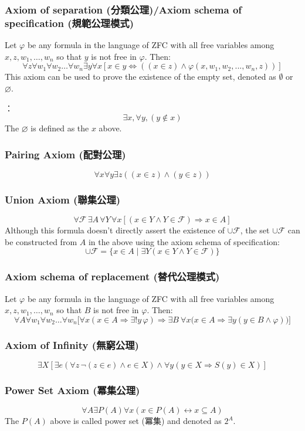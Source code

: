 \documentclass[a4paper,12pt]{article}
\begin{document}
\subsubsection{Axiom of separation (分類公理)/Axiom schema of specification (規範公理模式)}
Let $\varphi$ be any formula in the language of ZFC with all free variables among $x,z,w_{1},\ldots ,w_{n}$ so that $y$ is not free in 
$\varphi$. Then:
\[\forall z\forall w_{1}\forall w_{2}\ldots \forall w_{n}\exists y\forall x[x\in y\Leftrightarrow ((x\in z)\land \varphi (x,w_{1},w_{2},...,w_{n},z))]\]
This axiom can be used to prove the existence of the empty set, denoted as $\emptyset$ or $\varnothing$.

：
\[\exists x , \forall y , (y \notin x) \]
The $\varnothing$ is defined as the $x$ above.
\subsubsection{Pairing Axiom (配對公理)}
\[ \forall x\forall y\exists z((x\in z)\land (y\in z))\]
\subsubsection{Union Axiom (聯集公理)}
\[ \forall {\mathcal {F}}\,\exists A\,\forall Y\,\forall x[(x\in Y\land Y\in {\mathcal {F}})\Rightarrow x\in A]\]
Although this formula doesn't directly assert the existence of $\cup \mathcal {F}$, the set $\cup \mathcal {F}$ can be constructed from $A$ in the above using the axiom schema of specification:
\[\cup \mathcal {F}=\{x\in A\mid\exists Y(x\in Y\land Y\in {\mathcal {F}})\}\]
\subsubsection{Axiom schema of replacement (替代公理模式)}
Let $\varphi$ be any formula in the language of ZFC with all free variables among $x,z,w_{1},\ldots ,w_{n}$ so that $B$ is not free in 
$\varphi$. Then:
\[ \forall A\forall w_{1}\forall w_{2}\ldots \forall w_{n}{\bigl [}\forall x(x\in A\Rightarrow \exists !y\,\varphi )\Rightarrow \exists B\ \forall x{\bigl (}x\in A\Rightarrow \exists y(y\in B\land \varphi ){\bigr )}{\bigr ]}\]
\subsubsection{Axiom of Infinity (無窮公理)}
\[ \exists X\left[\exists e(\forall z\,\neg (z\in e)\land e\in X)\land \forall y(y\in X\Rightarrow S(y)\in X)\right]\]
\subsubsection{Power Set Axiom (冪集公理)}
\[\forall A \exists P(A) \forall x (x \in P(A) \leftrightarrow x \subseteq A)\]
The $P(A)$ above is called power set (冪集) and denoted as $2^A$.
\end{document}
